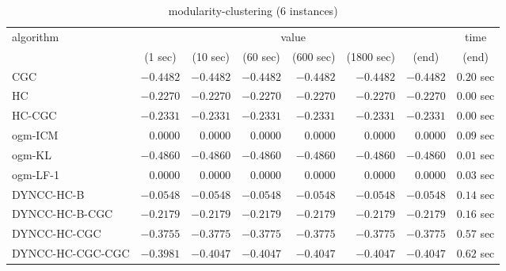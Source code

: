 \begin{table}[H]
\scriptsize
\centering
\caption{modularity-clustering (6 instances)}
\label{tab:anytimetable-modularity-clustering}
\begin{tabular}{lrrrrrrr}
\toprule
           algorithm &                                   \multicolumn{6}{c}{value} & \multicolumn{1}{c}{time}   \\  
\cmidrule(lr){2-7}\cmidrule(lr){8-8}  
                     & \multicolumn{1}{c}{(1 sec)} & \multicolumn{1}{c}{(10 sec)} & \multicolumn{1}{c}{(60 sec)} & \multicolumn{1}{c}{(600 sec)} & \multicolumn{1}{c}{(1800 sec)} & \multicolumn{1}{c}{(end)} & \multicolumn{1}{c}{(end)}   \\ \midrule 
                 CGC & $      -0.4482$ & $      -0.4482$ & $      -0.4482$ & $      -0.4482$ & $      -0.4482$ & $      -0.4482$ & $         0.20$ sec   \\ 
                  HC & $      -0.2270$ & $      -0.2270$ & $      -0.2270$ & $      -0.2270$ & $      -0.2270$ & $      -0.2270$ & $         0.00$ sec   \\ 
              HC-CGC & $      -0.2331$ & $      -0.2331$ & $      -0.2331$ & $      -0.2331$ & $      -0.2331$ & $      -0.2331$ & $         0.00$ sec   \\ 
             ogm-ICM & $       0.0000$ & $       0.0000$ & $       0.0000$ & $       0.0000$ & $       0.0000$ & $       0.0000$ & $         0.09$ sec   \\ 
              ogm-KL & $      -0.4860$ & $      -0.4860$ & $      -0.4860$ & $      -0.4860$ & $      -0.4860$ & $      -0.4860$ & $         0.01$ sec   \\ 
            ogm-LF-1 & $       0.0000$ & $       0.0000$ & $       0.0000$ & $       0.0000$ & $       0.0000$ & $       0.0000$ & $         0.03$ sec   \\ 
          DYNCC-HC-B & $      -0.0548$ & $      -0.0548$ & $      -0.0548$ & $      -0.0548$ & $      -0.0548$ & $      -0.0548$ & $         0.14$ sec   \\ 
      DYNCC-HC-B-CGC & $      -0.2179$ & $      -0.2179$ & $      -0.2179$ & $      -0.2179$ & $      -0.2179$ & $      -0.2179$ & $         0.16$ sec   \\ 
        DYNCC-HC-CGC & $      -0.3755$ & $      -0.3775$ & $      -0.3775$ & $      -0.3775$ & $      -0.3775$ & $      -0.3775$ & $         0.57$ sec   \\ 
    DYNCC-HC-CGC-CGC & $      -0.3981$ & $      -0.4047$ & $      -0.4047$ & $      -0.4047$ & $      -0.4047$ & $      -0.4047$ & $         0.62$ sec   \\ 

\end{tabular}
\end{table}
